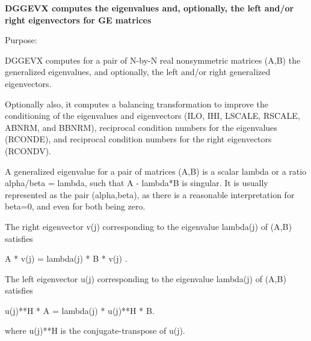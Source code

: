 {\bfseries  D\+G\+G\+E\+V\+X computes the eigenvalues and, optionally, the left and/or right eigenvectors for G\+E matrices} 

 \begin{DoxyParagraph}{Purpose\+: }
\begin{DoxyVerb} DGGEVX computes for a pair of N-by-N real nonsymmetric matrices (A,B)
 the generalized eigenvalues, and optionally, the left and/or right
 generalized eigenvectors.

 Optionally also, it computes a balancing transformation to improve
 the conditioning of the eigenvalues and eigenvectors (ILO, IHI,
 LSCALE, RSCALE, ABNRM, and BBNRM), reciprocal condition numbers for
 the eigenvalues (RCONDE), and reciprocal condition numbers for the
 right eigenvectors (RCONDV).

 A generalized eigenvalue for a pair of matrices (A,B) is a scalar
 lambda or a ratio alpha/beta = lambda, such that A - lambda*B is
 singular. It is usually represented as the pair (alpha,beta), as
 there is a reasonable interpretation for beta=0, and even for both
 being zero.

 The right eigenvector v(j) corresponding to the eigenvalue lambda(j)
 of (A,B) satisfies

                  A * v(j) = lambda(j) * B * v(j) .

 The left eigenvector u(j) corresponding to the eigenvalue lambda(j)
 of (A,B) satisfies

                  u(j)**H * A  = lambda(j) * u(j)**H * B.

 where u(j)**H is the conjugate-transpose of u(j).\end{DoxyVerb}
 
\end{DoxyParagraph}

